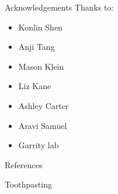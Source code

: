 \documentclass{beamer}%
\begin{document}
%
%
%

\begin{frame}{Acknowledgements}
%
 Thanks to:
 \begin{itemize}
   \item Konlin Shen
   \item Anji Tang
   \item Mason Klein
   \item Liz Kane
   \item Ashley Carter
   \item Aravi Samuel
   \item Garrity lab
 \end{itemize}
%
\end{frame}

\appendix

\begin{frame}[allowframebreaks]{References}
%

 {\small
 
 
 }
%
\end{frame}


\begin{frame}[label=fr_toothpaste]{Toothpasting}
%
  \begin{center}
 \end{center}
 \hyperlink{fr_loco}{}
%
\end{frame}

\end{document}
